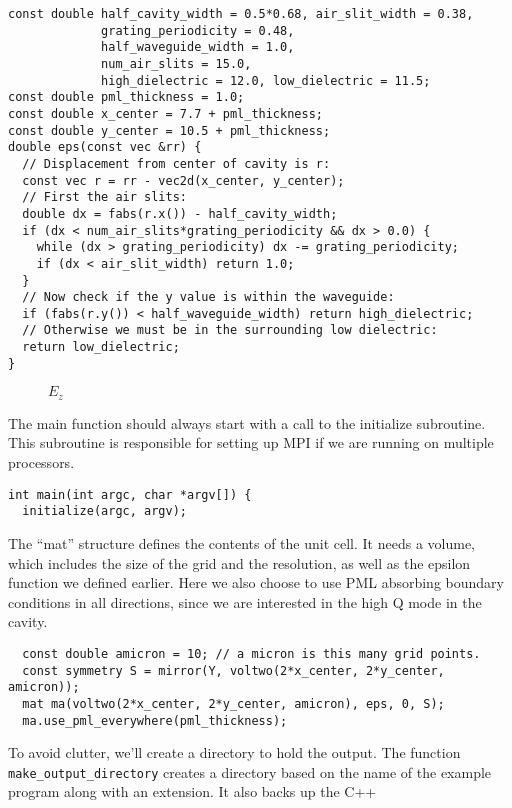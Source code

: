 \begin{verbatim}
const double half_cavity_width = 0.5*0.68, air_slit_width = 0.38,
             grating_periodicity = 0.48,
             half_waveguide_width = 1.0,
             num_air_slits = 15.0,
             high_dielectric = 12.0, low_dielectric = 11.5;
const double pml_thickness = 1.0;
const double x_center = 7.7 + pml_thickness;
const double y_center = 10.5 + pml_thickness;
double eps(const vec &rr) {
  // Displacement from center of cavity is r:
  const vec r = rr - vec2d(x_center, y_center);
  // First the air slits:
  double dx = fabs(r.x()) - half_cavity_width;
  if (dx < num_air_slits*grating_periodicity && dx > 0.0) {
    while (dx > grating_periodicity) dx -= grating_periodicity;
    if (dx < air_slit_width) return 1.0;
  }
  // Now check if the y value is within the waveguide:
  if (fabs(r.y()) < half_waveguide_width) return high_dielectric;
  // Otherwise we must be in the surrounding low dielectric:
  return low_dielectric;
}
\end{verbatim}
\begin{figure}
\label{simple_figure}
\caption{$E_z$}
\begin{center}
\end{center}
\end{figure}
The main function should always start with a call to the initialize
subroutine.  This subroutine is responsible for setting up MPI if we are
running on multiple processors.
\begin{verbatim}
int main(int argc, char *argv[]) {
  initialize(argc, argv);
\end{verbatim}
The ``mat'' structure defines the contents of the unit cell.  It needs a
volume, which includes the size of the grid and the resolution, as well as
the epsilon function we defined earlier.  Here we also choose to use PML
absorbing boundary conditions in all directions, since we are interested in
the high Q mode in the cavity.
\begin{verbatim}
  const double amicron = 10; // a micron is this many grid points.
  const symmetry S = mirror(Y, voltwo(2*x_center, 2*y_center, amicron));
  mat ma(voltwo(2*x_center, 2*y_center, amicron), eps, 0, S);
  ma.use_pml_everywhere(pml_thickness);
\end{verbatim}
To avoid clutter, we'll create a directory to hold the output.  The
function \verb!make_output_directory! creates a directory based on the name
of the example program along with an extension.  It also backs up the C++
